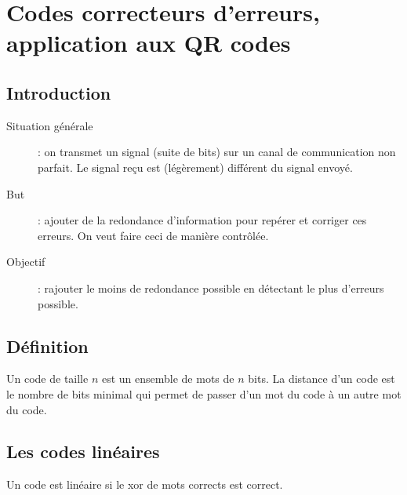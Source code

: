 \documentclass[10pt,a4paper]{article}
\begin{document}
\section{Codes correcteurs d'erreurs, application aux QR codes}
	\subsection{Introduction}
		\begin{description}
			\item[Situation générale]: on transmet un signal (suite de bits) sur un canal de communication non parfait. Le signal reçu est (légèrement) différent du signal envoyé.
			\item[But]: ajouter de la redondance d'information pour repérer et corriger ces erreurs. On veut faire ceci de manière contrôlée.
			\item[Objectif]: rajouter le moins de redondance possible en détectant le plus d'erreurs possible.
		\end{description}
	\subsection{Définition}
		Un code de taille $n$ est un ensemble de mots de $n$ bits.
		La distance d'un code est le nombre de bits minimal qui permet de passer d'un mot du code à un autre mot du code.
	\subsection{Les codes linéaires}
		Un code est linéaire si le xor de mots corrects est correct.
\end{document}
